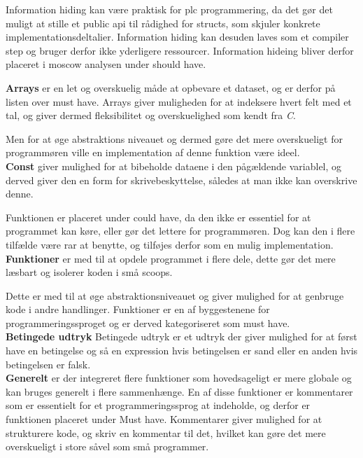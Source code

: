 Information hiding kan være praktisk for \gls{plc} programmering, da det gør det muligt at stille et public api til rådighed for structs, som skjuler konkrete implementationsdeltalier. Information hiding kan desuden laves som et compiler step og bruger derfor ikke yderligere ressourcer. Information hideing bliver derfor placeret i moscow analysen under should have.

\noindent\textbf{Arrays}
er en let og overskuelig måde at opbevare et dataset, og er derfor på listen over must have. Arrays giver muligheden for at indeksere hvert felt med et tal, og giver dermed fleksibilitet og overskuelighed som kendt fra \textit{C}.

Men for at øge abstraktions niveauet og dermed gøre det mere overskueligt for programmøren ville en implementation af denne funktion være ideel.\\

\noindent\textbf{Const}
giver mulighed for at bibeholde dataene i den pågældende variablel, og derved giver den en form for skrivebeskyttelse, således at man ikke kan overskrive denne.

Funktionen er placeret under could have, da den ikke er essentiel for at programmet kan køre, eller gør det lettere for programmøren. 
Dog kan den i flere tilfælde være rar at benytte, og tilføjes derfor som en mulig implementation.\\

\noindent\textbf{Funktioner}
er med til at opdele programmet i flere dele, dette gør det mere læsbart og isolerer koden i små scoops.

Dette er med til at øge abstraktionsniveauet og giver mulighed for at genbruge kode i andre handlinger.
Funktioner er en af byggestenene for programmeringssproget og er derved kategoriseret som must have.\\

\noindent\textbf{Betingede udtryk}
Betingede udtryk er et udtryk der giver mulighed for at først have en betingelse og så en expression hvis betingelsen er sand eller en anden hvis betingelsen er falsk.\\

\noindent\textbf{Generelt} er der integreret flere funktioner som hovedsageligt er mere globale og kan bruges generelt i flere sammenhænge. En af disse funktioner er kommentarer som er essentielt for et programmeringssprog at indeholde, og derfor er funktionen placeret under Must have. Kommentarer giver mulighed for at strukturere kode, og skriv en kommentar til det, hvilket kan gøre det mere overskueligt i store såvel som små programmer.

